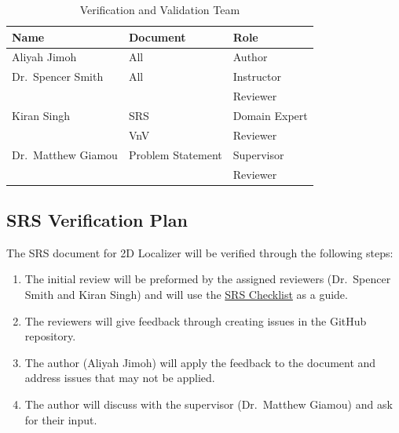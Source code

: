 \documentclass[12pt, titlepage]{article}
\begin{document}
\begin{center}
  \begin{table}[h]
    \centering
    
    \begin{tabular}{|l|l|p{5cm}|}
        \hline
        \textbf{Name} & \textbf{Document} & \textbf{Role} \\
        \hline
        Aliyah Jimoh & All & Author\\
        \hline
        Dr.~Spencer Smith & All & Instructor \\
                          &     & Reviewer\\
        \hline
        Kiran Singh & SRS & Domain Expert\\
                    & VnV & Reviewer      \\
        \hline
        Dr.~Matthew Giamou & Problem Statement & Supervisor \\
                           &                   & Reviewer \\
        \hline
    \end{tabular}

    \caption{Verification and Validation Team}
    \label{table:vnvTeam}
\end{table}
\end{center}

\subsection{SRS Verification Plan}\label{plan_SRS}

The SRS document for 2D Localizer will be verified through the following steps:
\begin{enumerate}
  \item The initial review will be preformed by the assigned reviewers (Dr.~Spencer Smith and Kiran Singh) and will use the \href{https://github.com/AliyahJimoh/2D-Localizer/blob/main/docs/Checklists/SRS-Checklist.pdf}{SRS Checklist} as a guide.
  \item The reviewers will give feedback through creating issues in the GitHub repository.
  \item The author (Aliyah Jimoh) will apply the feedback to the document and address issues that may not be applied.
  \item The author will discuss with the supervisor (Dr.~Matthew Giamou) and ask for their input.
\end{enumerate}

\end{document}
